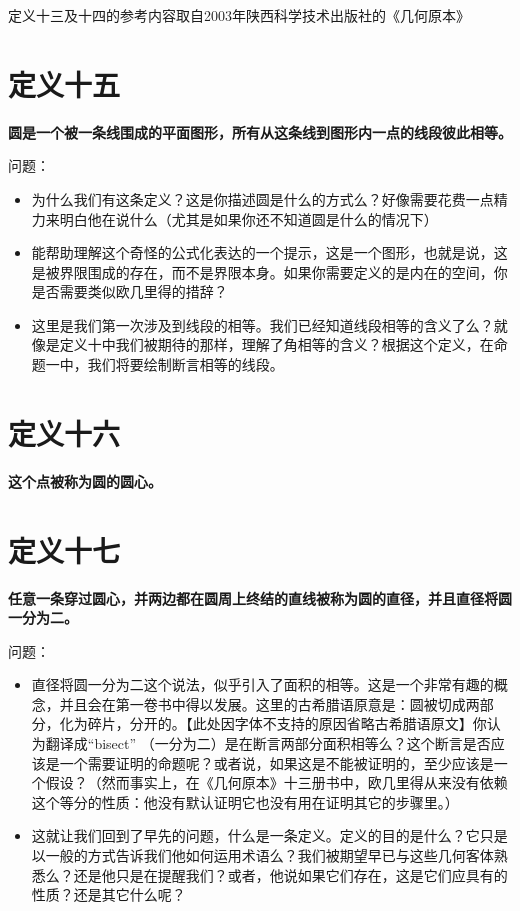 \documentclass[
]{book}
\begin{document}
定义十三及十四的参考内容取自2003年陕西科学技术出版社的《几何原本》

\hypertarget{ux5b9aux4e49ux5341ux4e94}{%
\section{定义十五}\label{ux5b9aux4e49ux5341ux4e94}}

\textbf{圆是一个被一条线围成的平面图形，所有从这条线到图形内一点的线段彼此相等。}

问题：

\begin{itemize}
\item
  为什么我们有这条定义？这是你描述圆是什么的方式么？好像需要花费一点精力来明白他在说什么（尤其是如果你还不知道圆是什么的情况下）
\item
  能帮助理解这个奇怪的公式化表达的一个提示，这是一个图形，也就是说，这是被界限围成的存在，而不是界限本身。如果你需要定义的是内在的空间，你是否需要类似欧几里得的措辞？
\item
  这里是我们第一次涉及到线段的相等。我们已经知道线段相等的含义了么？就像是定义十中我们被期待的那样，理解了角相等的含义？根据这个定义，在命题一中，我们将要绘制断言相等的线段。
\end{itemize}

\hypertarget{ux5b9aux4e49ux5341ux516d}{%
\section{定义十六}\label{ux5b9aux4e49ux5341ux516d}}

\textbf{这个点被称为圆的圆心。}

\hypertarget{ux5b9aux4e49ux5341ux4e03}{%
\section{定义十七}\label{ux5b9aux4e49ux5341ux4e03}}

\textbf{任意一条穿过圆心，并两边都在圆周上终结的直线被称为圆的直径，并且直径将圆一分为二。}

问题：

\begin{itemize}
\item
  直径将圆一分为二这个说法，似乎引入了面积的相等。这是一个非常有趣的概念，并且会在第一卷书中得以发展。这里的古希腊语原意是：圆被切成两部分，化为碎片，分开的。【此处因字体不支持的原因省略古希腊语原文】你认为翻译成``bisect'' （一分为二）是在断言两部分面积相等么？这个断言是否应该是一个需要证明的命题呢？或者说，如果这是不能被证明的，至少应该是一个假设？（然而事实上，在《几何原本》十三册书中，欧几里得从来没有依赖这个等分的性质：他没有默认证明它也没有用在证明其它的步骤里。）
\item
  这就让我们回到了早先的问题，什么是一条定义。定义的目的是什么？它只是以一般的方式告诉我们他如何运用术语么？我们被期望早已与这些几何客体熟悉么？还是他只是在提醒我们？或者，他说如果它们存在，这是它们应具有的性质？还是其它什么呢？
\end{itemize}
\end{document}
